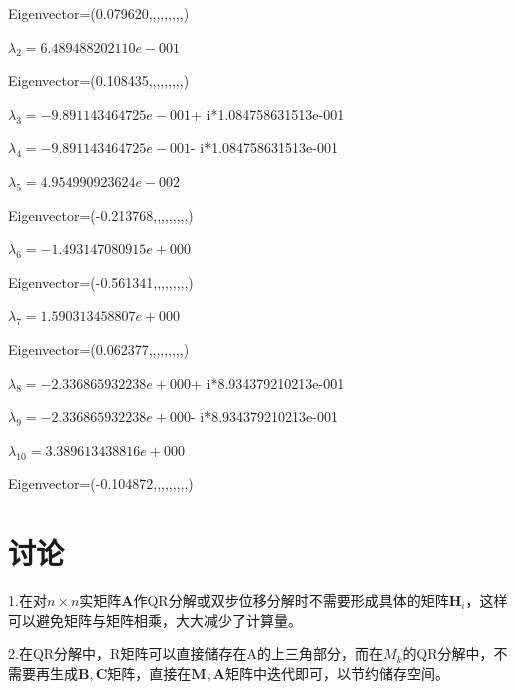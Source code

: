 Eigenvector=(0.079620,,,,,,,,,)


\vbox{}
$\lambda_{2}= 6.489488202110e-001$ 

Eigenvector=(0.108435,,,,,,,,,)


\vbox{}
$\lambda_{3}= -9.891143464725e-001$+ i*1.084758631513e-001


\vbox{}
$\lambda_{4}= -9.891143464725e-001$- i*1.084758631513e-001


\vbox{}
$\lambda_{5}= 4.954990923624e-002$ 

Eigenvector=(-0.213768,,,,,,,,,)


\vbox{}
$\lambda_{6}= -1.493147080915e+000$ 

Eigenvector=(-0.561341,,,,,,,,,)


\vbox{}
$\lambda_{7}= 1.590313458807e+000$ 

Eigenvector=(0.062377,,,,,,,,,)


\vbox{}
$\lambda_{8}= -2.336865932238e+000$+ i*8.934379210213e-001


\vbox{}
$\lambda_{9}= -2.336865932238e+000$- i*8.934379210213e-001


\vbox{}
$\lambda_{10}= 3.389613438816e+000$ 

Eigenvector=(-0.104872,,,,,,,,,)

\chapter{讨论}
\normalsize
1.在对$n\times n$实矩阵$\bm{A}$作QR分解或双步位移分解时不需要形成具体的矩阵$\bm{H}_i$，这样可以避免矩阵与矩阵相乘，大大减少了计算量。

2.在QR分解中，R矩阵可以直接储存在A的上三角部分，而在$M_k$的QR分解中，不需要再生成$\bm{B},\bm{C}$矩阵，直接在$\bm{M},\bm{A}$矩阵中迭代即可，以节约储存空间。

